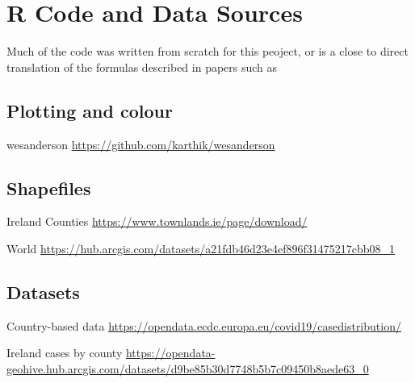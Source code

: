 \section{R Code and Data Sources}
\label{ch:codesource}

Much of the code was written from scratch for this peoject, or is a close to direct translation of the formulas described in papers such as %

\subsection{Plotting and colour}

wesanderson \url{https://github.com/karthik/wesanderson}

\subsection{Shapefiles}

Ireland Counties \url{https://www.townlands.ie/page/download/}

World \url{https://hub.arcgis.com/datasets/a21fdb46d23e4ef896f31475217cbb08_1}

\subsection{Datasets}

Country-based data \url{https://opendata.ecdc.europa.eu/covid19/casedistribution/}

Ireland cases by county  \url{https://opendata-geohive.hub.arcgis.com/datasets/d9be85b30d7748b5b7c09450b8aede63_0}